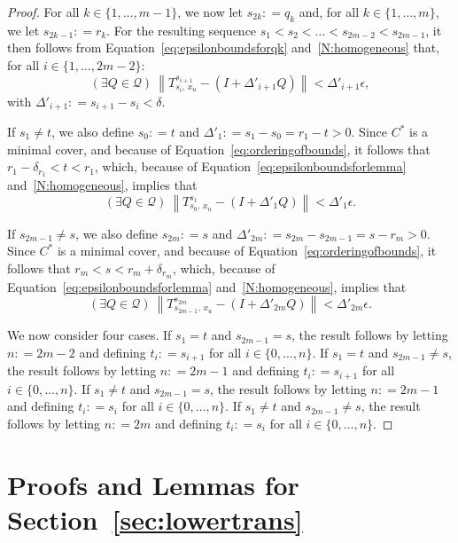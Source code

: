 \documentclass[10pt]{paper}
\theoremstyle{definition}
\newcommand{\rateset}{\mathcal{Q}}
\newcommand{\norm}[1]{\left\lVert #1 \right\rVert}
\newcommand{\coloneqq}{:\!=}
\begin{document}
\begin{proof}
For all $k\in\{1,\dots,m-1\}$, we now let $s_{2k}\coloneqq q_k$ and, for all $k\in\{1,\dots,m\}$, we let $s_{2k-1}\coloneqq r_k$. For the resulting sequence $s_1<s_2<\dots<s_{2m-2}<s_{2m-1}$, it then follows from Equation~\eqref{eq:epsilonboundsforqk} and~\ref{N:homogeneous} that, for all $i\in\{1,\dots,2m-2\}$:
\begin{equation*}
(\exists Q\in\rateset)
~
\norm{
T^{s_{i+1}}_{s_i,\,x_u}-(I+\Delta'_{i+1}Q)
}<\Delta'_{i+1}\epsilon,
\end{equation*}
with $\Delta'_{i+1}\coloneqq s_{i+1}-s_i<\delta$. 

If $s_1\neq t$, we also define $s_0\coloneqq t$ and $\Delta'_1\coloneqq s_1-s_0=r_1-t>0$. Since $C^*$ is a minimal cover, and because of Equation~\eqref{eq:orderingofbounds}, it follows that $r_1-\delta_{r_1}<t<r_1$, which, because of Equation~\eqref{eq:epsilonboundsforlemma} and~\ref{N:homogeneous}, implies that
\begin{equation*}
(\exists Q\in\rateset)
~
\norm{
T^{s_{1}}_{s_0,\,x_u}-(I+\Delta'_{1}Q)
}<\Delta'_{1}\epsilon.
\end{equation*}

If $s_{2m-1}\neq s$, we also define $s_{2m}\coloneqq s$ and $\Delta'_{2m}\coloneqq s_{2m}-s_{2m-1}=s-r_m>0$. Since $C^*$ is a minimal cover, and because of Equation~\eqref{eq:orderingofbounds}, it follows that $r_m<s<r_m+\delta_{r_m}$, which, because of Equation~\eqref{eq:epsilonboundsforlemma} and~\ref{N:homogeneous}, implies that
\begin{equation*}
(\exists Q\in\rateset)
~
\norm{
T^{s_{2m}}_{s_{2m-1},\,x_u}-(I+\Delta'_{2m}Q)
}<\Delta'_{2m}\epsilon.
\end{equation*}

We now consider four cases.
If $s_1=t$ and $s_{2m-1}=s$, the result follows by letting $n\coloneqq 2m-2$ and defining $t_i\coloneqq s_{i+1}$ for all $i\in\{0,\dots,n\}$. 
If $s_1=t$ and $s_{2m-1}\neq s$, the result follows by letting $n\coloneqq 2m-1$ and defining $t_i\coloneqq s_{i+1}$ for all $i\in\{0,\dots,n\}$.
If $s_1\neq t$ and $s_{2m-1}=s$, the result follows by letting $n\coloneqq 2m-1$ and defining $t_i\coloneqq s_{i}$ for all $i\in\{0,\dots,n\}$.
If $s_1\neq t$ and $s_{2m-1}\neq s$, the result follows by letting $n\coloneqq 2m$ and defining $t_i\coloneqq s_{i}$ for all $i\in\{0,\dots,n\}$.
\end{proof}

\section{Proofs and Lemmas for Section~\ref{sec:lowertrans}}
\end{document}
